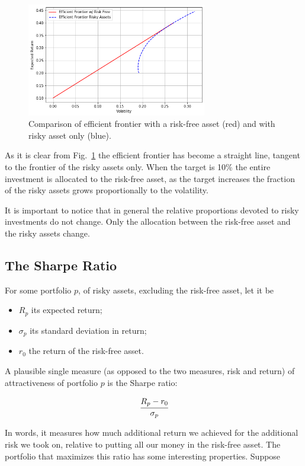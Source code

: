 \begin{figure}[htb]
\centering
    \includegraphics[width=0.7\textwidth]{figures/cal.png}
    \caption{Comparison of efficient frontier with a risk-free asset (red) and with risky asset only (blue).}
    \label{fig:cal}
\end{figure}
    
As it is clear from Fig.~\ref{fig:cal} the efficient frontier has become a
straight line, tangent to the frontier of the risky assets only. When
the target is 10\% the entire investment is allocated to the risk-free
asset, as the target increases the fraction of the risky assets grows
proportionally to the volatility. 

It is important to notice that in general the relative proportions
devoted to risky investments do not change. Only the allocation between
the risk-free asset and the risky assets change.

\subsection{The Sharpe Ratio}
\label{the-sharpe-ratio}

For some portfolio \(p\), of risky assets, excluding the risk-free
asset, let it be

\begin{itemize}
\tightlist
\item
  \(R_p\) its expected return;
\item
  \(\sigma_p\) its standard deviation in return;
\item
  \(r_0\) the return of the risk-free asset.
\end{itemize}

A plausible single measure (as opposed to the two measures, risk and
return) of attractiveness of portfolio \(p\) is the Sharpe ratio:

\[ \cfrac{R_p - r_0}{\sigma_p} \]

In words, it measures how much additional return we achieved for the
additional risk we took on, relative to putting all our money in the
risk-free asset. The portfolio that maximizes this ratio has some interesting
properties. Suppose

